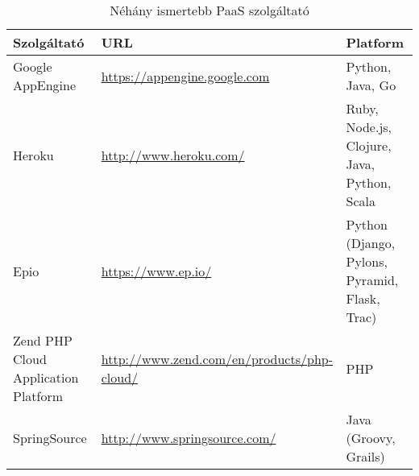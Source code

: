 \begin{table}[h]
	\caption{Néhány ismertebb PaaS szolgáltató}
	\centering
	\small
	\begin{tabular}{| p{4cm} | p{5.5cm} | p{4cm} |}
		\hline
		\rowcolor{MyTableColor} \textbf{Szolgáltató} & \textbf{URL} & \textbf{Platform} \\
		\hline
		Google AppEngine & \href{https://appengine.google.com}{https://appengine.google.com} & Python, Java, Go \\ 
		\hline
		Heroku & \href{http://www.heroku.com/}{http://www.heroku.com/} & Ruby, Node.js, Clojure, Java, Python, Scala \\
		\hline
		Epio & \href{https://www.ep.io/}{https://www.ep.io/} & Python (Django, Pylons, Pyramid, Flask, Trac) \\
		\hline
		Zend PHP Cloud Application Platform & \href{http://www.zend.com/en/products/php-cloud/}{http://www.zend.com/en/products/php-cloud/} & PHP\\
		\hline
		SpringSource & \href{http://www.springsource.com/}{http://www.springsource.com/} & Java (Groovy, Grails)\\
		\hline
	\end{tabular}
	\normalsize
	\label{tab:paas_providers}
\end{table}

